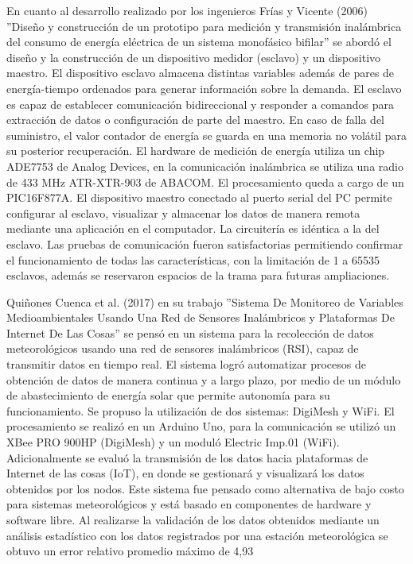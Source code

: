 \documentclass[12pt,letterpaper]{article}
\begin{document}
En cuanto al desarrollo realizado por los ingenieros Frías y Vicente (2006) ”Diseño y construcción de un prototipo para medición y transmisión inalámbrica del consumo de energía eléctrica de un sistema monofásico bifilar” se abordó el diseño y la construcción de un dispositivo medidor (esclavo) y un dispositivo maestro. El dispositivo esclavo almacena distintas variables además de pares de energía-tiempo ordenados para generar información sobre la demanda. El esclavo es capaz de establecer comunicación bidireccional y responder a comandos para extracción de datos o configuración de parte del maestro. En caso de falla del suministro, el valor contador de energía se guarda en una memoria no volátil para su posterior recuperación. El hardware de medición de energía utiliza un chip ADE7753 de Analog Devices, en la comunicación inalámbrica se utiliza una radio de 433 MHz ATR-XTR-903 de ABACOM. El procesamiento queda a cargo de un PIC16F877A. El dispositivo maestro conectado al puerto serial del PC permite configurar al esclavo, visualizar y almacenar los datos de manera remota mediante una aplicación en el computador. La circuitería es idéntica a la del esclavo. Las pruebas de comunicación fueron satisfactorias permitiendo confirmar el funcionamiento de todas las características, con la limitación de 1 a 65535 esclavos, además se reservaron espacios de la trama para futuras ampliaciones.


Quiñones Cuenca et al. (2017) en su trabajo ”Sistema De Monitoreo de Variables Medioambientales Usando Una Red de Sensores Inalámbricos y Plataformas De Internet De Las Cosas” se pensó en un sistema para la recolección de datos meteorológicos usando una red de sensores inalámbricos (RSI), capaz de transmitir datos en tiempo real. El sistema logró automatizar procesos de obtención de datos de manera continua y a largo plazo, por medio de un módulo de abastecimiento de energía solar que permite autonomía para su funcionamiento. Se propuso la utilización de dos sistemas: DigiMesh y WiFi. El procesamiento se realizó en un Arduino Uno, para la comunicación se utilizó un XBee PRO 900HP (DigiMesh) y un moduló Electric Imp.01 (WiFi). Adicionalmente se evaluó la transmisión de los datos hacia plataformas de Internet de las cosas (IoT), en donde se gestionará y visualizará los datos obtenidos por los nodos. Este sistema fue pensado como alternativa de bajo costo para sistemas meteorológicos y está basado en componentes de hardware y software libre. Al realizarse la validación de los datos obtenidos mediante un análisis estadístico con los datos registrados por una estación meteorológica se obtuvo un error relativo promedio máximo de 4,93 %
\end{document}
